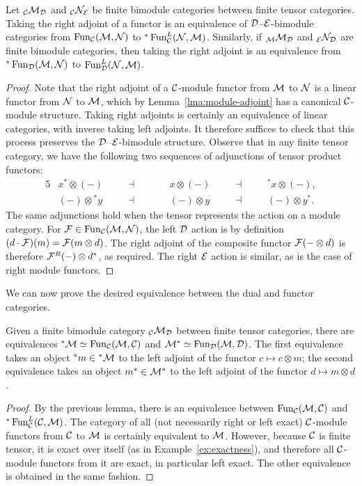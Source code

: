 \documentclass{amsart}
\begin{document}
\begin{lemma}
Let ${}_\mathcal C \mathcal M_\mathcal D$ and ${}_\mathcal C \mathcal N_\mathcal E$ be finite bimodule categories between finite tensor categories.  Taking the right adjoint of a functor is an equivalence of $\mathcal D$--$\mathcal E$-bimodule categories from $\operatorname{Fun}_\mathcal C(\mathcal M,\mathcal N)$ to ${}^* \operatorname{Fun}^L_\mathcal C(\mathcal N,\mathcal M)$.  Similarly, if ${}_\mathcal M \mathcal M_\mathcal D$ and ${}_\mathcal E \mathcal N_\mathcal D$ are finite bimodule categories, then taking the right adjoint is an equivalence from ${}^* \operatorname{Fun}_\mathcal D(\mathcal M,\mathcal N)$ to $\operatorname{Fun}^L_\mathcal D(\mathcal N,\mathcal M)$.
\end{lemma}
\begin{proof}
Note that the right adjoint of a $\mathcal C$-module functor from $\mathcal M$ to $\mathcal N$ is a linear functor from $\mathcal N$ to $\mathcal M$, which by Lemma~\ref{lma:module-adjoint} has a canonical $\mathcal C$-module structure.  Taking right adjoints is certainly an equivalence of linear categories, with inverse taking left adjoints.  It therefore suffices to check that this process preserves the $\mathcal D$--$\mathcal E$-bimodule structure.  Observe that in any finite tensor category, we have the following two sequences of adjunctions of tensor product functors:
\begin{alignat*}{5}
	& x^* \otimes (-)  \quad & &  \dashv \quad &&  \quad x \otimes (-)  \quad &&  \dashv &&  \quad {}^*x \otimes (-), \\
	& (-) \otimes {}^* y  \quad & &  \dashv \quad &&  \quad (-) \otimes y  \quad &&  \dashv &&  \quad (-) \otimes y^*. 
\end{alignat*}  
The same adjunctions hold when the tensor represents the action on a module category.  For $\mathcal F \in \operatorname{Fun}_{\mathcal C}(\mathcal M,\mathcal N)$, the left $\mathcal D$ action is by definition $(d \cdot \mathcal F)(m) = \mathcal F(m \otimes d)$.  The right adjoint of the composite functor $\mathcal F(- \otimes d)$ is therefore $\mathcal F^R(-) \otimes d^*$, as required.  The right $\mathcal E$ action is similar, as is the case of right module functors.
\end{proof}


We can now prove the desired equivalence between the dual and functor categories.
\begin{proposition} \label{prop:dual-formula-for-adjoints}
Given a finite bimodule category ${}_\mathcal C \mathcal M_\mathcal D$ between finite tensor categories, there are equivalences ${}^* \mathcal M \simeq \operatorname{Fun}_\mathcal C(\mathcal M,\mathcal C)$ and $\mathcal M^* \simeq \operatorname{Fun}_\mathcal D(\mathcal M,\mathcal D)$.  The first equivalence takes an object ${}^* m \in {}^* \mathcal M$ to the left adjoint of the functor $c \mapsto c \otimes m$; the second equivalence takes an object $m^* \in \mathcal M^*$ to the left adjoint of the functor $d \mapsto m \otimes d$.
\end{proposition}
\begin{proof}
By the previous lemma, there is an equivalence between $\operatorname{Fun}_\mathcal C(\mathcal M,\mathcal C)$ and ${}^* \operatorname{Fun}^L_\mathcal C(\mathcal C,\mathcal M)$.  The category of all (not necessarily right or left exact) $\mathcal C$-module functors from $\mathcal C$ to $\mathcal M$ is certainly equivalent to $\mathcal M$.  However, because $\mathcal C$ is finite tensor, it is exact over itself (as in Example~\ref{ex:exactness}), and therefore all $\mathcal C$-module functors from it are exact, in particular left exact.  The other equivalence is obtained in the same fashion.
\end{proof}
\end{document}
